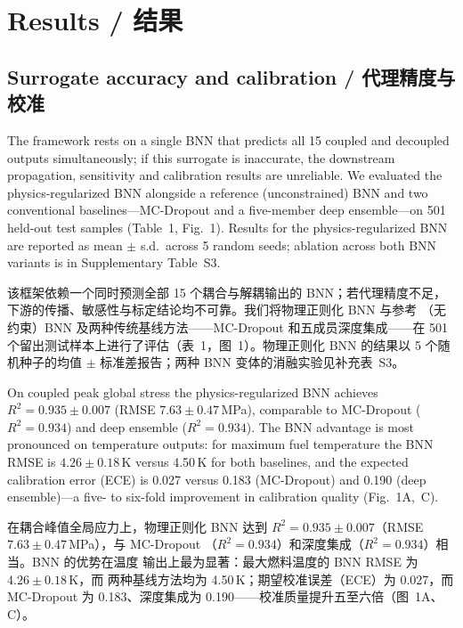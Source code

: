 \documentclass[11pt,a4paper]{article}
\begin{document}
\section{Results / 结果}

\subsection{Surrogate accuracy and calibration / 代理精度与校准}

The framework rests on a single BNN that predicts all 15 coupled and
decoupled outputs simultaneously; if this surrogate is inaccurate, the
downstream propagation, sensitivity and calibration results are
unreliable. We evaluated the physics-regularized BNN alongside a
reference (unconstrained) BNN and two conventional baselines---MC-Dropout
and a five-member deep ensemble---on 501 held-out test samples (Table~1,
Fig.~1). Results for the physics-regularized BNN are reported as
mean $\pm$ s.d.\ across 5 random seeds; ablation across both BNN
variants is in Supplementary Table~S3.

该框架依赖一个同时预测全部 15 个耦合与解耦输出的 BNN；若代理精度不足，
下游的传播、敏感性与标定结论均不可靠。我们将物理正则化 BNN 与参考
（无约束）BNN 及两种传统基线方法——MC-Dropout 和五成员深度集成——在
501 个留出测试样本上进行了评估（表~1，图~1）。物理正则化 BNN 的结果以
5 个随机种子的均值 $\pm$ 标准差报告；两种 BNN 变体的消融实验见补充表~S3。

On coupled peak global stress the physics-regularized BNN achieves
$R^2 = 0.935 \pm 0.007$ (RMSE $7.63 \pm 0.47$\,MPa), comparable to
MC-Dropout ($R^2 = 0.934$) and deep ensemble ($R^2 = 0.934$). The BNN
advantage is most pronounced on temperature outputs: for maximum fuel
temperature the BNN RMSE is $4.26 \pm 0.18$\,K versus 4.50\,K for both
baselines, and the expected calibration error (ECE) is 0.027 versus
0.183 (MC-Dropout) and 0.190 (deep ensemble)---a five- to six-fold
improvement in calibration quality (Fig.~1A,~C).

在耦合峰值全局应力上，物理正则化 BNN 达到
$R^2 = 0.935 \pm 0.007$（RMSE $7.63 \pm 0.47$\,MPa），与 MC-Dropout
（$R^2 = 0.934$）和深度集成（$R^2 = 0.934$）相当。BNN 的优势在温度
输出上最为显著：最大燃料温度的 BNN RMSE 为 $4.26 \pm 0.18$\,K，而
两种基线方法均为 4.50\,K；期望校准误差（ECE）为 0.027，而 MC-Dropout
为 0.183、深度集成为 0.190——校准质量提升五至六倍（图~1A、C）。
\end{document}
